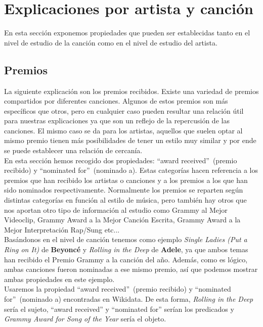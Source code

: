 \section{Explicaciones por artista y canción}

En esta sección exponemos propiedades que pueden ser establecidas tanto en el nivel de estudio de la canción como en el nivel de estudio del artista.

\subsection*{Premios}

La siguiente explicación son los premios recibidos. Existe una variedad de premios compartidos por diferentes canciones. Algunos de estos premios son más específicos que otros, pero en cualquier caso pueden resultar una relación útil para nuestras explicaciones ya que son un reflejo de la repercusión de las canciones. El mismo caso se da para los artistas, aquellos que suelen optar al mismo premio tienen más posibilidades de tener un estilo muy similar y por ende se puede establecer una relación de cercanía.\\

En esta sección hemos recogido dos propiedades: ``award received''~(premio recibido) y ``nominated for''~(nominado a). Estas categorías hacen referencia a los premios que han recibido los artistas o canciones y a los premios a los que han sido nominados respectivamente. Normalmente los premios se reparten según distintas categorías en función al estilo de música, pero también hay otros que nos aportan otro tipo de información al estudio como Grammy al Mejor Videoclip, Grammy Award a la Mejor Canción Escrita, Grammy Award a la Mejor Interpretación Rap/Sung etc...\\

Basándonos en el nivel de canción tenemos como ejemplo \textit{Single Ladies (Put a Ring on It)} de \textbf{Beyoncé} y \textit{Rolling in the Deep} de \textbf{Adele}, ya que ambos temas han recibido el Premio Grammy a la canción del año. Además, como es lógico, ambas canciones fueron nominadas a ese mismo premio, así que podemos mostrar ambas propiedades en este ejemplo.\\

Usaremos la propiedad ``award received''~(premio recibido) y ``nominated for''~(nominado a) encontradas en Wikidata. De esta forma, \textit{Rolling in the Deep} sería el sujeto, ``award received'' y ``nominated for'' serían los predicados y \textit{Grammy Award for Song of the Year} sería el objeto.\\

